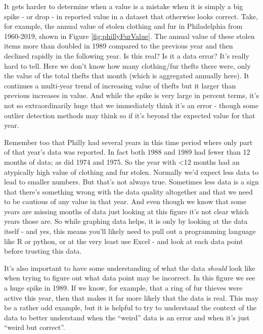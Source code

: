 \documentclass[
  12pt,
  openany]{book}
\begin{document}
It gets harder to determine when a value is a mistake when it is simply a big spike - or drop - in reported value in a dataset that otherwise looks correct. Take, for example, the annual value of stolen clothing and fur in Philadelphia from 1960-2019, shown in Figure \ref{fig:phillyFurValue}. The annual value of these stolen items more than doubled in 1989 compared to the previous year and then declined rapidly in the following year. Is this real? Is it a data error? It's really hard to tell. Here we don't know how many clothing/fur thefts there were, only the value of the total thefts that month (which is aggregated annually here). It continues a multi-year trend of increasing value of thefts but it larger than previous increases in value. And while the spike is very large in percent terms, it's not so extraordinarily huge that we immediately think it's an error - though some outlier detection methods may think so if it's beyond the expected value for that year.

Remember too that Philly had several years in this time period where only part of that year's data was reported. In fact both 1988 and 1989 had fewer than 12 months of data; as did 1974 and 1975. So the year with \textless12 months had an atypically high value of clothing and fur stolen. Normally we'd expect less data to lead to smaller numbers. But that's not always true. Sometimes less data is a sign that there's something wrong with the data quality altogether and that we need to be cautious of any value in that year. And even though we know that some years are missing months of data just looking at this figure it's not clear which years those are. So while graphing data helps, it is only by looking at the data itself - and yes, this means you'll likely need to pull out a programming language like R or python, or at the very least use Excel - and look at each data point before trusting this data.

It's also important to have some understanding of what the data \emph{should} look like when trying to figure out what data point may be incorrect. In this figure we see a huge spike in 1989. If we know, for example, that a ring of fur thieves were active this year, then that makes it far more likely that the data is real. This may be a rather odd example, but it is helpful to try to understand the context of the data to better understand when the ``weird'' data is an error and when it's just ``weird but correct''.
\end{document}
